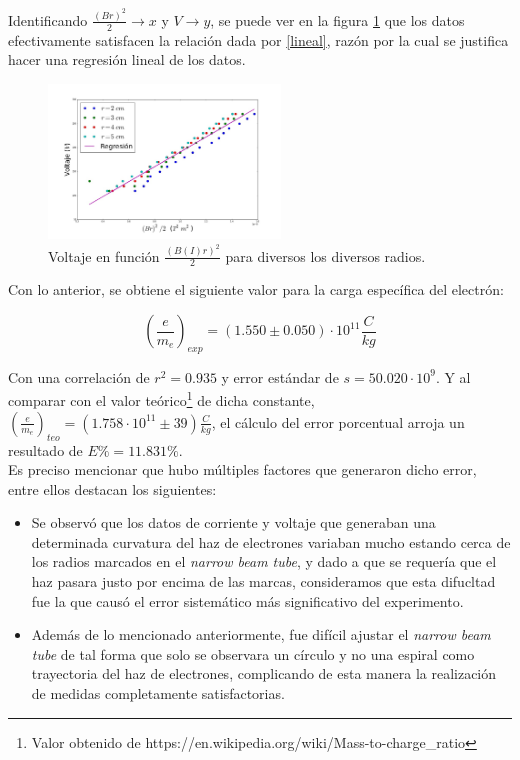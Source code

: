 \documentclass[prb,aps,twocolumn,preprintnumbers,amsmath,amssymb]{revtex4}
\begin{document}
Identificando $\frac{(Br)^2}{2} \rightarrow x$ y $V \rightarrow y$, se puede ver en la figura \ref{fig:lineal} que los datos efectivamente satisfacen la relación dada por \eqref{lineal}, razón por la cual se justifica hacer una regresión lineal de los datos.\\

\begin{figure}[h!]
	\centering
	\includegraphics[width=0.55\textwidth]{carga-masa-reg}
	\caption{Voltaje en función $\frac{(B(I)r)^2}{2}$ para diversos los diversos radios.}
	\label{fig:lineal}
\end{figure}

Con lo anterior, se obtiene el siguiente valor para la carga específica del electrón:

\begin{equation}
\left( \frac{e}{m_{e}} \right)_{exp} = (1.550 \pm 0.050) \cdot 10^{11} \frac{C}{kg} 
\end{equation}

Con una correlación de $r^2 = 0.935$ y error estándar de $s = 50.020 \cdot 10^{9}$. Y al comparar con el valor teórico\footnote{Valor obtenido de https://en.wikipedia.org/wiki/Mass-to-charge\_ratio} de dicha constante, $\left( \frac{e}{m_{e}} \right)_{teo} = (1.758 \cdot 10^{11}  \pm 39)  \frac{C}{kg}$, el cálculo del error porcentual arroja un resultado de $E\% = 11.831\%$.\\

Es preciso mencionar que hubo múltiples factores que generaron dicho error, entre ellos destacan los siguientes:

\begin{itemize}
	\item Se observó que los datos de corriente y voltaje que generaban una determinada curvatura del haz de electrones variaban mucho estando cerca de los radios marcados en el \textit{narrow beam tube}, y dado a que se requería que el haz pasara justo por encima de las marcas, consideramos que esta difucltad fue la que causó el error sistemático más significativo del experimento.
	
	\item Además de lo mencionado anteriormente, fue difícil ajustar el \textit{narrow beam tube} de tal forma que solo se observara un círculo y no una espiral como trayectoria del haz de electrones, complicando de esta manera la realización de medidas completamente satisfactorias.
\end{itemize}
	
\end{document}
